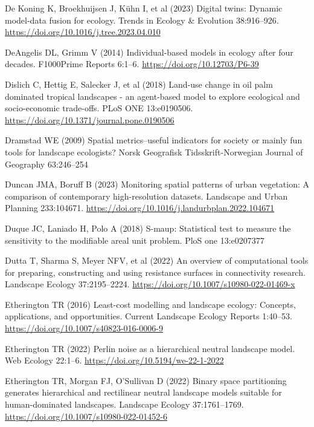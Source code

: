 \documentclass[
  10pt,
  a4paperpaper,
]{article}
\newlength{\cslhangindent}
\newenvironment{CSLReferences}[2] %
 {\begin{list}{}{%
  \setlength{\itemindent}{0pt}
  \setlength{\leftmargin}{0pt}
  \setlength{\parsep}{0pt}
  \ifodd #1
   \setlength{\leftmargin}{\cslhangindent}
   \setlength{\itemindent}{-1\cslhangindent}
  \fi
  \setlength{\itemsep}{#2\baselineskip}}}
 {\end{list}}
\begin{document}
\begin{CSLReferences}{1}{1}
De Koning K, Broekhuijsen J, Kühn I, et al (2023) Digital twins: Dynamic
model-data fusion for ecology. Trends in Ecology \& Evolution
38:916--926. \url{https://doi.org/10.1016/j.tree.2023.04.010}

DeAngelis DL, Grimm V (2014) Individual-based models in ecology after
four decades. F1000Prime Reports 6:1--6.
\url{https://doi.org/10.12703/P6-39}

Dislich C, Hettig E, Salecker J, et al (2018) Land-use change in oil
palm dominated tropical landscapes - an agent-based model to explore
ecological and socio-economic trade-offs. PLoS ONE 13:e0190506.
\url{https://doi.org/10.1371/journal.pone.0190506}

Dramstad WE (2009) Spatial metrics--useful indicators for society or
mainly fun tools for landscape ecologists? Norsk Geografisk
Tidsskrift-Norwegian Journal of Geography 63:246--254

Duncan JMA, Boruff B (2023) Monitoring spatial patterns of urban
vegetation: A comparison of contemporary high-resolution datasets.
Landscape and Urban Planning 233:104671.
\url{https://doi.org/10.1016/j.landurbplan.2022.104671}

Duque JC, Laniado H, Polo A (2018) S-maup: Statistical test to measure
the sensitivity to the modifiable areal unit problem. PloS one
13:e0207377

Dutta T, Sharma S, Meyer NFV, et al (2022) An overview of computational
tools for preparing, constructing and using resistance surfaces in
connectivity research. Landscape Ecology 37:2195--2224.
\url{https://doi.org/10.1007/s10980-022-01469-x}

Etherington TR (2016) Least-cost modelling and landscape ecology:
Concepts, applications, and opportunities. Current Landscape Ecology
Reports 1:40--53. \url{https://doi.org/10.1007/s40823-016-0006-9}

Etherington TR (2022) Perlin noise as a hierarchical neutral landscape
model. Web Ecology 22:1--6. \url{https://doi.org/10.5194/we-22-1-2022}

Etherington TR, Morgan FJ, O'Sullivan D (2022) Binary space partitioning
generates hierarchical and rectilinear neutral landscape models suitable
for human-dominated landscapes. Landscape Ecology 37:1761--1769.
\url{https://doi.org/10.1007/s10980-022-01452-6}


\end{CSLReferences}
\end{document}
